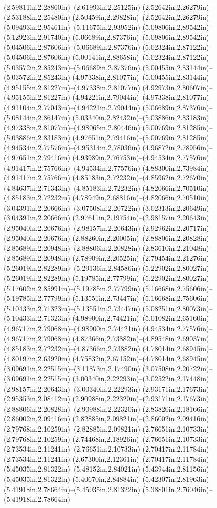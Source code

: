 (2.59811in,2.28860in)--(2.61993in,2.25125in) (2.52642in,2.26279in)--(2.53188in,2.25480in) (2.50459in,2.29828in)--(2.52642in,2.26279in) (5.09493in,2.95461in)--(5.11675in,2.93952in) (5.09806in,2.89542in)--(5.12923in,2.91740in) (5.06689in,2.87376in)--(5.09806in,2.89542in) (5.04506in,2.87606in)--(5.06689in,2.87376in) (5.02324in,2.87122in)--(5.04506in,2.87606in) (5.00141in,2.88658in)--(5.02324in,2.87122in) (5.03572in,2.85243in)--(5.06689in,2.87376in) (5.00455in,2.83144in)--(5.03572in,2.85243in) (4.97338in,2.81077in)--(5.00455in,2.83144in) (4.95155in,2.81227in)--(4.97338in,2.81077in) (4.92973in,2.80607in)--(4.95155in,2.81227in) (4.94221in,2.79044in)--(4.97338in,2.81077in) (4.91104in,2.77043in)--(4.94221in,2.79044in) (5.06689in,2.87376in)--(5.08144in,2.86147in) (5.03340in,2.82432in)--(5.03886in,2.83183in) (4.97338in,2.81077in)--(4.98065in,2.80446in) (5.00769in,2.81285in)--(5.03886in,2.83183in) (4.97651in,2.79416in)--(5.00769in,2.81285in) (4.94534in,2.77576in)--(4.95314in,2.78036in) (4.96872in,2.78956in)--(4.97651in,2.79416in) (4.93989in,2.76753in)--(4.94534in,2.77576in) (4.91417in,2.75766in)--(4.94534in,2.77576in) (4.88300in,2.73984in)--(4.91417in,2.75766in) (4.85183in,2.72232in)--(4.85962in,2.72670in) (4.84637in,2.71343in)--(4.85183in,2.72232in) (4.82066in,2.70510in)--(4.85183in,2.72232in) (4.78949in,2.68816in)--(4.82066in,2.70510in) (3.04391in,2.20666in)--(3.07508in,2.20722in) (3.02313in,2.20649in)--(3.04391in,2.20666in) (2.97611in,2.19754in)--(2.98157in,2.20643in) (2.95040in,2.20676in)--(2.98157in,2.20643in) (2.92962in,2.20717in)--(2.95040in,2.20676in) (2.88260in,2.20005in)--(2.88806in,2.20828in) (2.85689in,2.20948in)--(2.88806in,2.20828in) (2.83610in,2.21048in)--(2.85689in,2.20948in) (2.78909in,2.20525in)--(2.79454in,2.21276in) (5.26019in,2.82289in)--(5.29136in,2.84586in) (5.22902in,2.80027in)--(5.26019in,2.82289in) (5.19785in,2.77799in)--(5.22902in,2.80027in) (5.17602in,2.85991in)--(5.19785in,2.77799in) (5.16668in,2.75606in)--(5.19785in,2.77799in) (5.13551in,2.73447in)--(5.16668in,2.75606in) (5.10433in,2.71323in)--(5.13551in,2.73447in) (5.08251in,2.80073in)--(5.10433in,2.71323in) (4.98900in,2.74421in)--(5.01082in,2.65160in) (4.96717in,2.79068in)--(4.98900in,2.74421in) (4.94534in,2.77576in)--(4.96717in,2.79068in) (4.87366in,2.73882in)--(4.89548in,2.69037in) (4.85183in,2.72232in)--(4.87366in,2.73882in) (4.78014in,2.68945in)--(4.80197in,2.63920in) (4.75832in,2.67152in)--(4.78014in,2.68945in) (3.09691in,2.22515in)--(3.11873in,2.17490in) (3.07508in,2.20722in)--(3.09691in,2.22515in) (3.00340in,2.22293in)--(3.02522in,2.17448in) (2.98157in,2.20643in)--(3.00340in,2.22293in) (2.93171in,2.17673in)--(2.95353in,2.08412in) (2.90988in,2.22320in)--(2.93171in,2.17673in) (2.88806in,2.20828in)--(2.90988in,2.22320in) (2.83820in,2.18166in)--(2.86002in,2.09416in) (2.82885in,2.09821in)--(2.86002in,2.09416in) (2.79768in,2.10259in)--(2.82885in,2.09821in) (2.76651in,2.10733in)--(2.79768in,2.10259in) (2.74468in,2.18926in)--(2.76651in,2.10733in) (2.73534in,2.11241in)--(2.76651in,2.10733in) (2.70417in,2.11784in)--(2.73534in,2.11241in) (2.67300in,2.12361in)--(2.70417in,2.11784in) (5.45035in,2.81322in)--(5.48152in,2.84021in) (5.43944in,2.81156in)--(5.45035in,2.81322in) (5.40670in,2.84884in)--(5.42307in,2.81963in) (5.41918in,2.78664in)--(5.45035in,2.81322in) (5.38801in,2.76046in)--(5.41918in,2.78664in) 